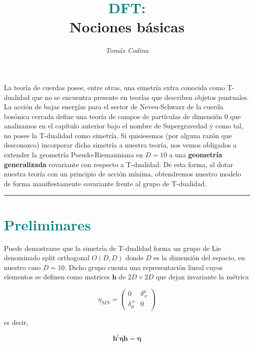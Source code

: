\documentclass{article}
\title{\vspace{-35pt}\huge{\textbf{\textcolor{teal}{DFT:}}} \\ \vspace{0.1cm} \large{\textbf{Nociones básicas}}}
\date{\vspace{-20pt}}
\author{\textit{Tomás Codina}}
\numberwithin{equation}{section}
\begin{document}
\maketitle
\thispagestyle{fancy}






La teoría de cuerdas posee, entre otras, una simetría extra conocida como T-dualidad que no se encuentra presente en teorías que describen objetos puntuales. La acción de bajas energías para el sector de Neveu-Schwarz de la cuerda bosónica cerrada define una teoría de campos de partículas de dimensión $ 0 $ que analizamos en el capítulo anterior bajo el nombre de Supergravedad y como tal, no posee la T-dualidad como simetría. Si quisiesemos (por alguna razón que desconozco) incorporar dicha simetría a nuestra teoría, nos vemos obligados a extender la geometría Pseudo-Riemanniana en $ D=10 $ a una \textbf{geometría generalizada} covariante con respecto a T-dualidad. De esta forma, al dotar nuestra teoría con un principio de acción mínima, obtendremos nuestro modelo de forma manifiestamente covariante frente al grupo de T-dualidad.

\rule{\textwidth}{0.4pt}

\section{\textcolor{teal}{Preliminares}}\label{sec_preliminares}

Puede demostrarse que la simetría de T-dualidad forma un grupo de Lie denominado split orthogonal $ O(D,D) $ donde $ D $ es la dimensión del espacio, en nuestro caso $ D=10 $. Dicho grupo cuenta una representación lineal cuyos elementos se definen como matrices $ \textbf{h} $ de $ 2D \times 2D $ que dejan invariante la métrica

\begin{equation}\label{key}
\eta_{MN} = \begin{pmatrix}
0 & \delta^{\mu}_{ \ \nu} \\
\delta_{\mu}^{ \ \nu} & 0 
\end{pmatrix}
\end{equation}

es decir,

\begin{equation}\label{key}
\textbf{h}^t \pmb{\eta} \textbf{h} = \pmb{\eta}
\end{equation}
\end{document}
